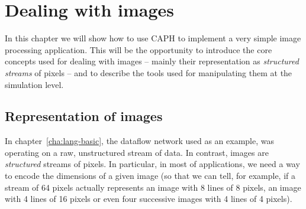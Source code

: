 
\chapter{Dealing with images}
\label{cha:lang-images}

In this chapter we will show how to use CAPH to implement a very simple image processing application.
This will be the opportunity to introduce the core concepts used for dealing with images -- mainly
their representation as \emph{structured streams} of pixels -- and to describe the tools used for
manipulating them at the simulation level.

\section{Representation of images}
\label{sec:repr-imag}

In chapter~\ref{cha:lang-basic}, the dataflow network used as an example, was operating on a raw,
unstructured stream of data. In contrast, images are \emph{structured} streams of pixels. In
particular, in most of applications, we need a way to encode the dimensions of a given image (so
that we can tell, for example, if a stream of 64 pixels actually represents an image with 8 lines of
8 pixels, an image with 4 lines of 16 pixels or even four successive images with 4 lines of 4
pixels).

